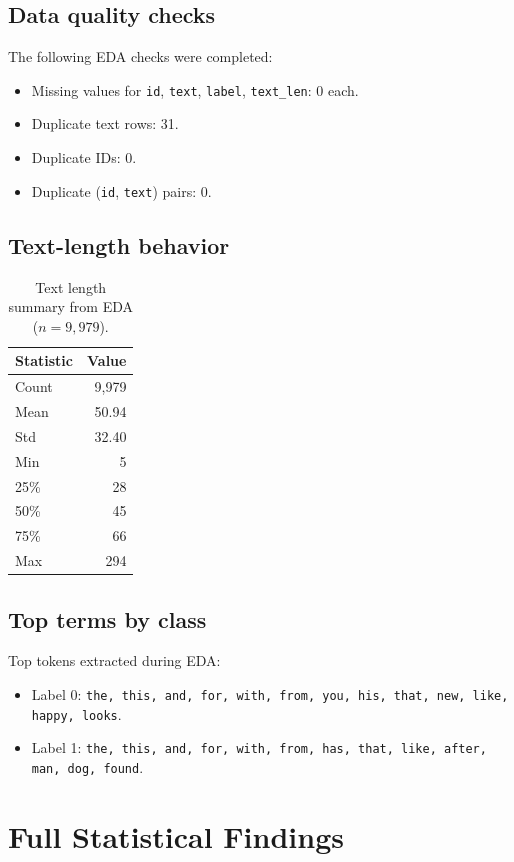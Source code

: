 \documentclass[a4paper,10.5pt,twoside]{article}
\begin{document}
\subsection{Data quality checks}
The following EDA checks were completed:
\begin{itemize}
    \item Missing values for \texttt{id}, \texttt{text}, \texttt{label}, \texttt{text\_len}: 0 each.
    \item Duplicate text rows: 31.
    \item Duplicate IDs: 0.
    \item Duplicate (\texttt{id}, \texttt{text}) pairs: 0.
\end{itemize}

\subsection{Text-length behavior}
\begin{table}[H]
\centering
\caption{Text length summary from EDA (\(n=9,979\)).}
\label{tab:textlen_summary}
\begin{tabular}{|l|r|}
\hline
\textbf{Statistic} & \textbf{Value} \\
\hline
Count & 9,979 \\
Mean & 50.94 \\
Std & 32.40 \\
Min & 5 \\
25\% & 28 \\
50\% & 45 \\
75\% & 66 \\
Max & 294 \\
\hline
\end{tabular}
\end{table}

\subsection{Top terms by class}
Top tokens extracted during EDA:
\begin{itemize}
    \item Label 0: \texttt{the, this, and, for, with, from, you, his, that, new, like, happy, looks}.
    \item Label 1: \texttt{the, this, and, for, with, from, has, that, like, after, man, dog, found}.
\end{itemize}

\section{Full Statistical Findings}
\end{document}
